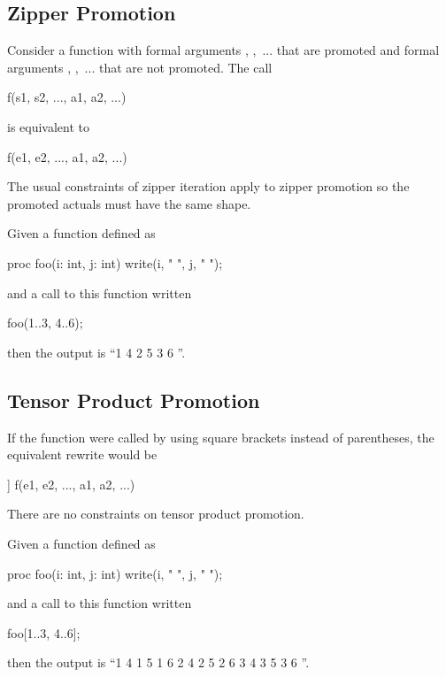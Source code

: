\subsection{Zipper Promotion}
\label{Zipper_Promotion}

Consider a function  with formal
arguments , ,~... that are promoted and formal
arguments , ,~... that are not promoted.  The call
\begin{chapel}
f(s1, s2, ..., a1, a2, ...)
\end{chapel}
is equivalent to
\begin{chapel}
[(e1, e2, ...) in (s1, s2, ...)] f(e1, e2, ..., a1, a2, ...)
\end{chapel}
The usual constraints of zipper iteration apply to zipper promotion so
the promoted actuals must have the same shape.

\begin{example}
Given a function defined as
\begin{chapel}
proc foo(i: int, j: int) {
  write(i, " ", j, " ");
}
\end{chapel}
and a call to this function written
\begin{chapel}
foo(1..3, 4..6);
\end{chapel}
then the output is ``1 4 2 5 3 6 ''.
\end{example}

\subsection{Tensor Product Promotion}
\label{Tensor_Product_Promotion}

If the function  were called by using square brackets instead
of parentheses, the equivalent rewrite would be
\begin{chapel}
[(e1, e2, ...) in [s1, s2, ...]] f(e1, e2, ..., a1, a2, ...)
\end{chapel}
There are no constraints on tensor product promotion.

\begin{example}
Given a function defined as
\begin{chapel}
proc foo(i: int, j: int) {
  write(i, " ", j, " ");
}
\end{chapel}
and a call to this function written
\begin{chapel}
foo[1..3, 4..6];
\end{chapel}
then the output is ``1 4 1 5 1 6 2 4 2 5 2 6 3 4 3 5 3 6 ''.
\end{example}

